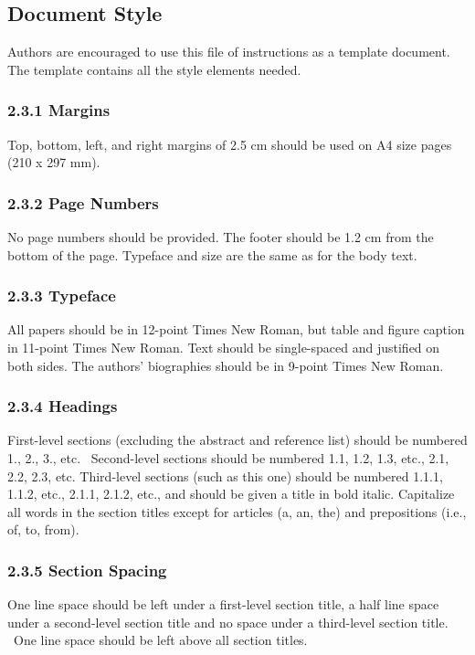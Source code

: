 \documentclass[a4paper]{article}
\begin{document}
\subsection{Document Style}
{
Authors are encouraged to use this file of instructions as a template
document. The template contains all the style elements needed.}

\subsubsection{2.3.1 Margins}
{
Top, bottom, left, and right margins of 2.5 cm should be used on A4 size
pages (210 x 297 mm).}

\subsubsection{2.3.2 Page Numbers}
{
No page numbers should be provided. The footer should be 1.2 cm from the
bottom of the page. Typeface and size are the same as for the body
text.}

\subsubsection{2.3.3 Typeface }
{
All papers should be in 12-point Times New Roman, but table and figure
caption in 11-point Times New Roman. Text should be single-spaced and
justified on both sides. The authors’ biographies should be in 9-point
Times New Roman.}

\subsubsection{2.3.4 Headings}
{
First-level sections (excluding the abstract and reference list) should
be numbered 1., 2., 3., etc. \ Second-level sections should be numbered
1.1, 1.2, 1.3, etc., 2.1, 2.2, 2.3, etc. Third-level sections (such as
this one) should be numbered 1.1.1, 1.1.2, etc., 2.1.1, 2.1.2, etc.,
and should be given a title in bold italic. Capitalize all words in the
section titles except for articles (a, an, the) and prepositions (i.e.,
of, to, from).}

\subsubsection[2.3.5 Section Spacing]{2.3.5 Section Spacing}
{
One line space should be left under a first-level section title, a half
line space under a second-level section title and no space under a
third-level section title. \ One line space should be left above all
section titles. }
\end{document}
